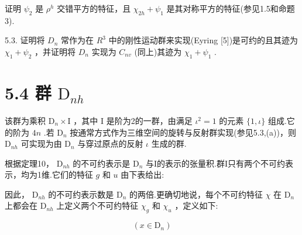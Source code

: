 \documentclass[10pt]{article}
\begin{document}
证明 \({\psi }_{2}\) 是 \({\rho }^{h}\) 交错平方的特征，且 \({\chi }_{2h} + {\psi }_{1}\) 是其对称平方的特征(参见1.5和命题3).

5.3. 证明将 \({D}_{n}\) 常作为在 \({R}^{3}\) 中的刚性运动群来实现(Eyring [5])是可约的且其迹为 \({\chi }_{1} + {\psi }_{2}\) ，并证明将 \({D}_{n}\) 实现为 \({C}_{nv}\) (同上)其迹为 \({\chi }_{1} + {\psi }_{1}\) .

\section*{5.4 群 \({\mathrm{D}}_{nh}\)}

该群为乘积 \({\mathrm{D}}_{n} \times  \mathrm{I}\) ，其中 \(\mathrm{I}\) 是阶为2的一群，由满足 \({\iota }^{2} = 1\) 的元素 \(\{ 1,\iota \}\) 组成.它的阶为 \({4n}\) .若 \({\mathrm{D}}_{n}\) 按通常方式作为三维空间的旋转与反射群实现(参见5.3,(a))，则 \({\mathrm{D}}_{nh}\) 可实现为由 \({\mathrm{D}}_{n}\) 与穿过原点的反射 \(\iota\) 生成的群.

根据定理10， \({\mathrm{D}}_{nh}\) 的不可约表示是 \({\mathrm{D}}_{n}\) 与I的表示的张量积.群I只有两个不可约表示，均为1维.它们的特征 \(g\) 和 \(u\) 由下表给出:

\begin{center}
\end{center}

因此， \({\mathrm{D}}_{nh}\) 的不可约表示数是 \({\mathrm{D}}_{n}\) 的两倍.更确切地说，每个不可约特征 \(\chi\) 在 \({\mathrm{D}}_{n}\) 上都会在 \({\mathrm{D}}_{nh}\) 上定义两个不可约特征 \({\chi }_{g}\) 和 \({\chi }_{u}\) ，定义如下:

\[
\left( {x \in  {\mathrm{D}}_{n}}\right)
\]

\begin{center}
\end{center}
\end{document}
